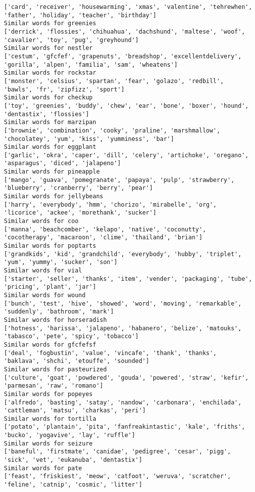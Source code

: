 \documentclass[11pt]{article}
\begin{document}
\begin{Verbatim}[commandchars=\\\{\}]
['card', 'receiver', 'housewarming', 'xmas', 'valentine', 'tehrewhen', 'father', 'holiday', 'teacher', 'birthday']
Similar words for greenies
['derrick', 'flossies', 'chihuahua', 'dachshund', 'maltese', 'woof', 'cavalier', 'toy', 'pug', 'greyhound']
Similar words for nestler
['cestum', 'gfcfef', 'grapenuts', 'breadshop', 'excellentdelivery', 'gorilla', 'alpen', 'familia', 'sam', 'wheatens']
Similar words for rockstar
['monster', 'celsius', 'spartan', 'fear', 'golazo', 'redbill', 'bawls', 'fr', 'zipfizz', 'sport']
Similar words for checkup
['toy', 'greenies', 'buddy', 'chew', 'ear', 'bone', 'boxer', 'hound', 'dentastix', 'flossies']
Similar words for marzipan
['brownie', 'combination', 'cooky', 'praline', 'marshmallow', 'chocolatey', 'yum', 'kiss', 'yumminess', 'bar']
Similar words for eggplant
['garlic', 'okra', 'caper', 'dill', 'celery', 'artichoke', 'oregano', 'asparagus', 'diced', 'jalapeno']
Similar words for pineapple
['mango', 'guava', 'pomegranate', 'papaya', 'pulp', 'strawberry', 'blueberry', 'cranberry', 'berry', 'pear']
Similar words for jellybeans
['harry', 'everybody', 'hmm', 'chorizo', 'mirabelle', 'org', 'licorice', 'ackee', 'morethank', 'sucker']
Similar words for coo
['manna', 'beachcomber', 'kelapo', 'native', 'coconutty', 'cocotherapy', 'macaroon', 'clime', 'thailand', 'brian']
Similar words for poptarts
['grandkids', 'kid', 'grandchild', 'everybody', 'hubby', 'triplet', 'yum', 'yummy', 'sucker', 'son']
Similar words for vial
['starter', 'seller', 'thanks', 'item', 'vender', 'packaging', 'tube', 'pricing', 'plant', 'jar']
Similar words for wound
['bunch', 'test', 'hive', 'showed', 'word', 'moving', 'remarkable', 'suddenly', 'bathroom', 'mark']
Similar words for horseradish
['hotness', 'harissa', 'jalapeno', 'habanero', 'belize', 'matouks', 'tabasco', 'pete', 'spicy', 'tobacco']
Similar words for gfcfefsf
['deal', 'fogbustin', 'value', 'vincafe', 'thank', 'thanks', 'baklava', 'shchi', 'etouffe', 'sounded']
Similar words for pasteurized
['culture', 'goat', 'powdered', 'gouda', 'powered', 'straw', 'kefir', 'parmesan', 'raw', 'romano']
Similar words for popeyes
['alfredo', 'basting', 'satay', 'nandow', 'carbonara', 'enchilada', 'cattleman', 'matsu', 'charkas', 'peri']
Similar words for tortilla
['potato', 'plantain', 'pita', 'fanfreakintastic', 'kale', 'friths', 'bucko', 'yogavive', 'lay', 'ruffle']
Similar words for seizure
['baneful', 'firstmate', 'canidae', 'pedigree', 'cesar', 'pigg', 'sick', 'vet', 'eukanuba', 'dentastix']
Similar words for pate
['feast', 'friskiest', 'meow', 'catfoot', 'weruva', 'scratcher', 'feline', 'catnip', 'cosmic', 'litter']

\end{Verbatim}
\end{document}
